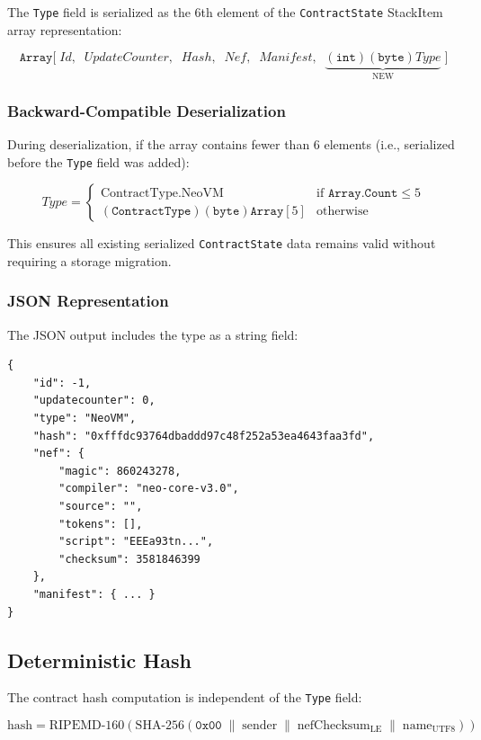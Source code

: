\documentclass[11pt,a4paper]{article}
\begin{document}
The \texttt{Type} field is serialized as the 6th element of the
\texttt{ContractState} StackItem array representation:

\[
\texttt{Array}\Big[\;Id,\;\; UpdateCounter,\;\; Hash,\;\; Nef,\;\; Manifest,\;\; \underbrace{(\texttt{int})(\texttt{byte})Type}_{\text{NEW}}\;\Big]
\]

\subsubsection{Backward-Compatible Deserialization}

During deserialization, if the array contains fewer than 6 elements (i.e.,
serialized before the \texttt{Type} field was added):

\[
Type =
\begin{cases}
\text{ContractType.NeoVM} & \text{if } \texttt{Array.Count} \leq 5 \\
(\texttt{ContractType})(\texttt{byte})\texttt{Array}[5] & \text{otherwise}
\end{cases}
\]

This ensures all existing serialized \texttt{ContractState} data remains
valid without requiring a storage migration.

\subsubsection{JSON Representation}

The JSON output includes the type as a string field:

\begin{lstlisting}[caption={ContractState JSON representation}]
{
    "id": -1,
    "updatecounter": 0,
    "type": "NeoVM",
    "hash": "0xfffdc93764dbaddd97c48f252a53ea4643faa3fd",
    "nef": {
        "magic": 860243278,
        "compiler": "neo-core-v3.0",
        "source": "",
        "tokens": [],
        "script": "EEEa93tn...",
        "checksum": 3581846399
    },
    "manifest": { ... }
}
\end{lstlisting}

\subsection{Deterministic Hash}

The contract hash computation is independent of the \texttt{Type} field:

\begin{equation}
\text{hash} = \text{RIPEMD-160}\!\left(
    \text{SHA-256}\!\left(
        \texttt{0x00} \;\|\; \text{sender} \;\|\; \text{nefChecksum}_{\text{LE}} \;\|\; \text{name}_{\text{UTF8}}
    \right)
\right)
\label{eq:hash}
\end{equation}
\end{document}
